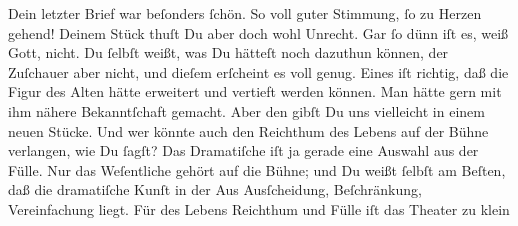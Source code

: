 \pstart
           Dein letzter Brief war beſonders ſchön. So voll guter Stimmung, ſo zu Herzen gehend!
               Deinem Stück thuſt Du aber
               doch wohl Unrecht. Gar ſo {\pb} dünn iſt es, weiß Gott, nicht. Du ſelbſt weißt, was Du hätteſt  noch dazuthun können, der Zuſchauer aber nicht,
               und dieſem erſcheint es voll genug. Eines iſt  richtig, daß die Figur des Alten hätte erweitert und vertieft werden können. Man hätte gern mit ihm
               nähere Bekanntſchaft gemacht. Aber den gibſt Du uns vielleicht in einem neuen Stücke.
               Und wer könnte auch den Reichthum des Lebens auf der Bühne verlangen, wie Du ſagſt?
                  \strikeout{\textcolor{gray}{×}} Das {\pb}Dramatiſche iſt ja gerade eine Auswahl
               aus der Fülle. Nur das Weſentliche gehört  auf die
               Bühne; und Du weißt ſelbſt am Beſten, daß die dramatiſche Kunſt in der Aus\strikeout{\textcolor{gray}{×}} Ausſcheidung, Beſchränkung, Vereinfachung liegt. Für des Lebens Reichthum und
               Fülle  iſt das Theater zu klein{\dotssix}\pend
           

